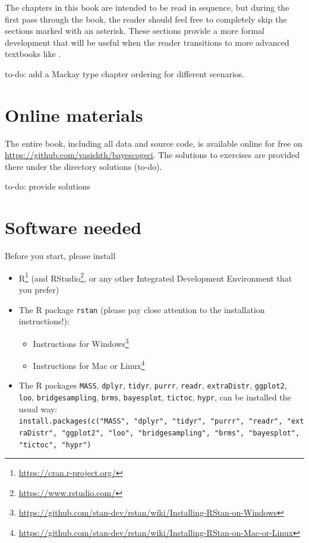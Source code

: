\documentclass[12pt,]{krantz}
\makeatletter
\providecommand{\tightlist}{%
  \setlength{\itemsep}{0pt}\setlength{\parskip}{0pt}}
\renewcommand{\href}[2]{#2\footnote{\url{#1}}}
\newenvironment{kframe}{%
\medskip{}
\setlength{\fboxsep}{.8em}
 \def\at@end@of@kframe{}%
 \ifinner\ifhmode%
  \def\at@end@of@kframe{\end{minipage}}%
  \begin{minipage}{\columnwidth}%
 \fi\fi%
 \def\FrameCommand##1{\hskip\@totalleftmargin \hskip-\fboxsep
 \colorbox{shadecolor}{##1}\hskip-\fboxsep
     \hskip-\linewidth \hskip-\@totalleftmargin \hskip\columnwidth}%
 \MakeFramed {\advance\hsize-\width
   \@totalleftmargin\z@ \linewidth\hsize
   \@setminipage}}%
 {\par\unskip\endMakeFramed%
 \at@end@of@kframe}
\newenvironment{rmdblock}[1]
  {
  \begin{itemize}
  \renewcommand{\labelitemi}{
    \raisebox{-.7\height}[0pt][0pt]{
      {\setkeys{Gin}{width=3em,keepaspectratio}\texttt{[image: images/\#1]}}
    }
  }
  \setlength{\fboxsep}{1em}
  \begin{kframe}
  \item
  }
  {
  \end{kframe}
  \end{itemize}
  }
\newenvironment{rmdnote}
  {\begin{rmdblock}{note}}
  {\end{rmdblock}}
\theoremstyle{definition}
\theoremstyle{definition}
\theoremstyle{definition}
\theoremstyle{remark}
\makeatother
\begin{document}
The chapters in this book are intended to be read in sequence, but
during the first pass through the book, the reader should feel free to
completely skip the sections marked with an asterisk. These sections
provide a more formal development that will be useful when the reader
transitions to more advanced textbooks like \citet{Gelman14}.

\begin{rmdnote} to-do: add a Mackay type chapter ordering for
different scenarios. \end{rmdnote}

\section{Online materials}\label{online-materials}

The entire book, including all data and source code, is available online
for free on \url{https://github.com/vasishth/bayescogsci}. The solutions
to exercises are provided there under the directory solutions (to-do).

\begin{rmdnote} to-do: provide solutions
\end{rmdnote}

\section{Software needed}\label{software-needed}

Before you start, please install

\begin{itemize}
\tightlist
\item
  \href{https://cran.r-project.org/}{R} (and
  \href{https://www.rstudio.com/}{RStudio}, or any other Integrated
  Development Environment that you prefer)
\item
  The R package \texttt{rstan} (please pay close attention to the
  installation instructions!):

  \begin{itemize}
  \tightlist
  \item
    \href{https://github.com/stan-dev/rstan/wiki/Installing-RStan-on-Windows}{Instructions
    for Windows}
  \item
    \href{https://github.com/stan-dev/rstan/wiki/Installing-RStan-on-Mac-or-Linux}{Instructions
    for Mac or Linux}
  \end{itemize}
\item
  The R packages \texttt{MASS}, \texttt{dplyr}, \texttt{tidyr},
  \texttt{purrr}, \texttt{readr}, \texttt{extraDistr}, \texttt{ggplot2},
  \texttt{loo}, \texttt{bridgesampling}, \texttt{brms},
  \texttt{bayesplot}, \texttt{tictoc}, \texttt{hypr}, can be installed
  the usual way:
  \texttt{install.packages(c("MASS",\ "dplyr",\ "tidyr",\ "purrr",\ "readr",\ "extraDistr",\ "ggplot2",\ "loo",\ "bridgesampling",\ "brms",\ "bayesplot",\ "tictoc",\ "hypr")}
\end{itemize}
\end{document}
